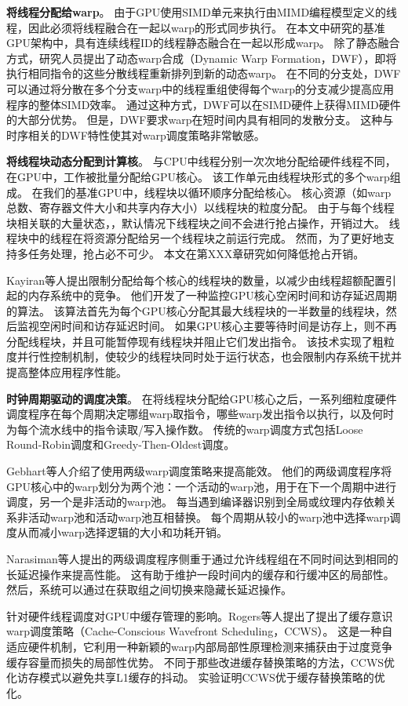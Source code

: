 \textbf{将线程分配给warp}。
由于GPU使用SIMD单元来执行由MIMD编程模型定义的线程，因此必须将线程融合在一起以warp的形式同步执行。 
在本文中研究的基准GPU架构中，具有连续线程ID的线程静态融合在一起以形成warp。 
除了静态融合方式，研究人员提出了动态warp合成（Dynamic Warp Formation，DWF），即将执行相同指令的这些分散线程重新排列到新的动态warp。 
在不同的分支处，DWF可以通过将分散在多个分支warp中的线程重组使得每个warp的分支减少提高应用程序的整体SIMD效率。 
通过这种方式，DWF可以在SIMD硬件上获得MIMD硬件的大部分优势。 
但是，DWF要求warp在短时间内具有相同的发散分支。 
这种与时序相关的DWF特性使其对warp调度策略非常敏感。

\textbf{将线程块动态分配到计算核}。
与CPU中线程分别一次次地分配给硬件线程不同，
在GPU中，工作被批量分配给GPU核心。 
该工作单元由线程块形式的多个warp组成。 
在我们的基准GPU中，线程块以循环顺序分配给核心。 
核心资源（如warp总数、寄存器文件大小和共享内存大小）以线程块的粒度分配。 
由于与每个线程块相关联的大量状态，，默认情况下线程块之间不会进行抢占操作，开销过大。
线程块中的线程在将资源分配给另一个线程块之前运行完成。
然而，为了更好地支持多任务处理，抢占必不可少。
本文在第XXX章研究如何降低抢占开销。

Kayiran等人提出限制分配给每个核心的线程块的数量，以减少由线程超额配置引起的内存系统中的竞争。 
他们开发了一种监控GPU核心空闲时间和访存延迟周期的算法。 
该算法首先为每个GPU核心分配其最大线程块的一半数量的线程块，然后监视空闲时间和访存延迟时间。 
如果GPU核心主要等待时间是访存上，则不再分配线程块，并且可能暂停现有线程块并阻止它们发出指令。 
该技术实现了粗粒度并行性控制机制，使较少的线程块同时处于运行状态，也会限制内存系统干扰并提高整体应用程序性能。


\textbf{时钟周期驱动的调度决策}。
在将线程块分配给GPU核心之后，一系列细粒度硬件调度程序在每个周期决定哪组warp取指令，哪些warp发出指令以执行，以及何时为每个流水线中的指令读取/写入操作数。
传统的warp调度方式包括Loose Round-Robin调度和Greedy-Then-Oldest调度。

Gebhart等人介绍了使用两级warp调度策略来提高能效。
他们的两级调度程序将GPU核心中的warp划分为两个池：一个活动的warp池，用于在下一个周期中进行调度，另一个是非活动的warp池。
每当遇到编译器识别到全局或纹理内存依赖关系非活动warp池和活动warp池互相替换。
每个周期从较小的warp池中选择warp调度从而减小warp选择逻辑的大小和功耗开销。 

Narasiman等人提出的两级调度程序侧重于通过允许线程组在不同时间达到相同的长延迟操作来提高性能。
这有助于维护一段时间内的缓存和行缓冲区的局部性。
然后，系统可以通过在获取组之间切换来隐藏长延迟操作。

针对硬件线程调度对GPU中缓存管理的影响。Rogers等人提出了提出了缓存意识warp调度策略（Cache-Conscious Wavefront Scheduling，CCWS）。
这是一种自适应硬件机制，它利用一种新颖的warp内部局部性原理检测来捕获由于过度竞争缓存容量而损失的局部性优势。
不同于那些改进缓存替换策略的方法，CCWS优化访存模式以避免共享L1缓存的抖动。
实验证明CCWS优于缓存替换策略的优化。



